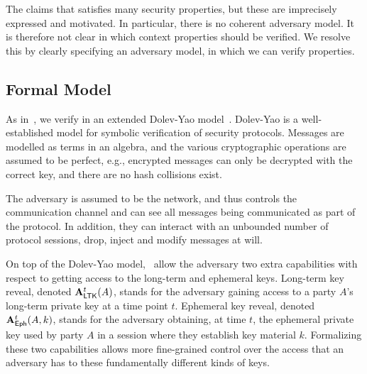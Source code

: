 The \mEdhoc{} \mSpec{} \cite{our-analysis-selander-lake-edhoc-00} claims
that \mEdhoc{} satisfies many security properties, but these are imprecisely
expressed and motivated.
%
In particular, there is no coherent adversary model.
%
It is therefore not clear in which context properties should be verified.
%
We resolve this by clearly specifying an adversary model, in which we can verify
properties.
%

\subsection{Formal Model}\label{sec:threat-model}

As in~\cite{Norr21}, we verify \mEdhoc{} in an extended
Dolev-Yao model~\cite{DY83}.
%
Dolev-Yao is a well-established model for symbolic verification of security
protocols.
%
Messages are modelled as terms in an algebra, and the various cryptographic
operations are assumed to be perfect, e.g., encrypted messages can only be
decrypted with the correct key, and there are no hash collisions exist.
%

The adversary is assumed to be the network, and thus controls the communication
channel and can see all messages being communicated as part of the protocol.
%
In addition, they can interact with an unbounded number of protocol sessions,
drop, inject and modify messages at will.
%

On top of the Dolev-Yao model,~\cite{Norr21} allow the adversary two extra
capabilities with respect to getting access to the long-term and ephemeral keys.
%
Long-term key reveal, denoted $\mathbf{A}_{\textsf{LTK}}^{t}(A)$, stands for the adversary
gaining access to a party $A$'s long-term private key  at a time point $t$.
%
Ephemeral key reveal, denoted $\mathbf{A}_{\textsf{Eph}}^{t}(A, k)$, stands for the adversary
obtaining, at time $t$, the ephemeral private key  used by party $A$
in a session where they establish key material $k$.
%
%
Formalizing these two capabilities allows more fine-grained control
over the access that an adversary has to these fundamentally different kinds of
keys.
%

